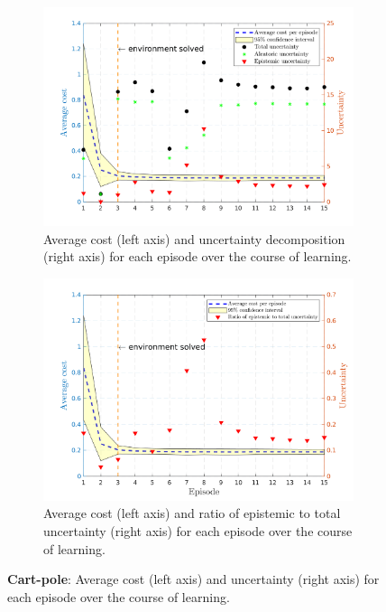 \begin{figure}[htbp]    
  \begin{subfigure}[b]{1\linewidth}
    \centering
    \includegraphics[height=0.4\textheight,width=1\textwidth]{Chapter3/Figures/cp_uncertainty.png} 
    \caption{Average cost (left axis) and uncertainty decomposition (right axis) for each episode over the course of learning.} 
    \label{Fig:Re-cp-uncertainty} 
  \end{subfigure}
  
  \begin{subfigure}[b]{1\linewidth}
    \centering
    \includegraphics[height=0.4\textheight,width=1\textwidth]{Chapter3/Figures/cp_uncertainty_norm.png} 
    \caption{Average cost (left axis) and ratio of epistemic to total uncertainty (right axis) for each episode over the course of learning.} 
    \label{Fig:Re-cp-uncertainty-norm} 
  \end{subfigure}  
\caption[Uncertainty decomposition for \textbf{cart-pole} environment]{\textbf{Cart-pole}: Average cost (left axis) and uncertainty (right axis) for each episode over the course of learning.}
\label{Fig:Re-cp-full-uncertainty} 
\end{figure}
 
